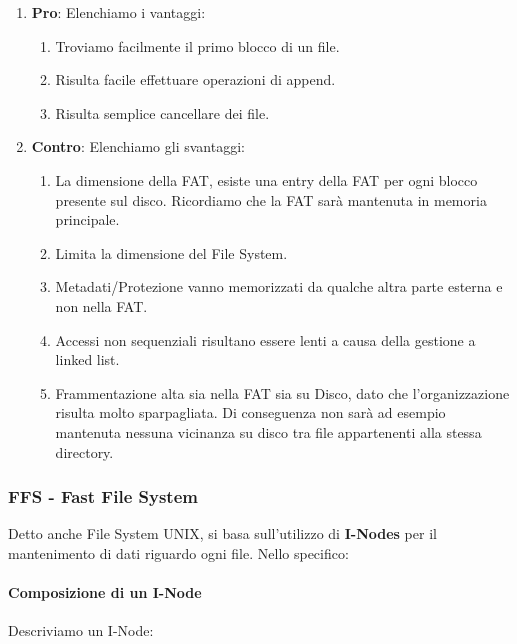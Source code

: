 \documentclass{article}
\begin{document}
\begin{enumerate}
    \item \textbf{Pro}: Elenchiamo i vantaggi:
    \begin{enumerate}
        \item Troviamo facilmente il primo blocco di un file.
        \item Risulta facile effettuare operazioni di append.
        \item Risulta semplice cancellare dei file.
    \end{enumerate}
    \item \textbf{Contro}: Elenchiamo gli svantaggi:
    \begin{enumerate}
        \item La dimensione della FAT, esiste una entry della FAT per ogni blocco presente sul disco. Ricordiamo che la FAT sarà mantenuta in memoria principale.
        \item Limita la dimensione del File System.
        \item Metadati/Protezione vanno memorizzati da qualche altra parte esterna e non nella FAT.
        \item Accessi non sequenziali risultano essere lenti a causa della gestione a linked list.
        \item Frammentazione alta sia nella FAT sia su Disco, dato che l'organizzazione risulta molto sparpagliata. Di conseguenza non sarà ad esempio mantenuta nessuna vicinanza su disco tra file appartenenti alla stessa directory.
    \end{enumerate}
\end{enumerate}

\newpage

\subsubsection{FFS - Fast File System}

Detto anche File System UNIX, si basa sull'utilizzo di \textbf{I-Nodes} per il mantenimento di dati riguardo ogni file. Nello specifico:

\paragraph{Composizione di un I-Node} Descriviamo un I-Node:
\end{document}
